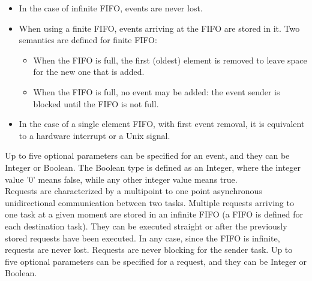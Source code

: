 \documentclass{llncs}
\begin{document}
\begin{itemize}
    \item In the case of infinite FIFO, events are never lost.
    \item When using a finite FIFO, events arriving at the FIFO are stored in it. Two semantics are defined for finite FIFO:
    \begin{itemize}
        \item When the FIFO is full, the first (oldest) element is removed to leave space for the new one that is
            added.
        \item When the FIFO is full, no event may be added: the event sender is blocked until the FIFO is not full.
    \end{itemize}
    \item In the case of a single element FIFO, with first event removal, it is equivalent to a hardware interrupt or a Unix signal.\\
\end{itemize}
%
Up to five optional parameters can be specified for an event, and they can be Integer or Boolean. The Boolean type is
defined as an Integer, where the integer value '0' means false, while any other integer value means true.\\
%
Requests are characterized by a multipoint to one point asynchronous unidirectional communication between two tasks.
Multiple requests arriving to one task at a given moment are stored in an infinite FIFO (a FIFO is defined for each
destination task). They can be executed straight or after the previously stored
requests have been executed. In any case, since the FIFO is infinite, requests
are never lost.
Requests are never blocking for the sender task. Up to five optional parameters can be specified for a request, and they can be Integer or Boolean.\\
%
\end{document}
